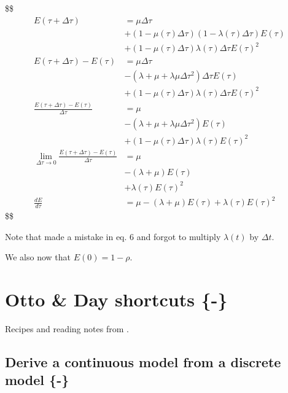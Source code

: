 \documentclass[
]{book}
\theoremstyle{definition}
\theoremstyle{definition}
\theoremstyle{definition}
\theoremstyle{definition}
\theoremstyle{remark}
\begin{document}
\$\$
\begin{align}
  E(\tau + \Delta \tau) &= \mu\Delta \tau \\
  & + (1 - \mu(\tau)\Delta \tau)(1 - \lambda(\tau)\Delta \tau) E(\tau) \\
  & + (1 - \mu(\tau)\Delta \tau) \lambda(\tau)\Delta \tau E(\tau)^2 \\
  
  E(\tau + \Delta \tau) - E(\tau) &= \mu\Delta \tau \\
  & - (\lambda + \mu + \lambda \mu \Delta \tau^2) \Delta \tau E(\tau) \\
  & + (1 - \mu(\tau)\Delta \tau) \lambda(\tau)\Delta \tau E(\tau)^2 \\

  \frac{E(\tau + \Delta \tau) - E(\tau)}{\Delta\tau} &= \mu \\
  & - (\lambda + \mu + \lambda \mu \Delta \tau^2) E(\tau) \\
  & + (1 - \mu(\tau)\Delta \tau) \lambda(\tau) E(\tau)^2
  \\

\lim_{\Delta\tau \to 0} \frac{E(\tau + \Delta \tau) - E(\tau)}{\Delta\tau} &= \mu \\
  & - (\lambda + \mu) E(\tau) \\
  & + \lambda(\tau) E(\tau)^2
  \\

\frac{dE}{d\tau} &= \mu - (\lambda + \mu) E(\tau) + \lambda(\tau) E(\tau)^2

\end{align}
\$\$

Note that \citet{morlon_reconciling_2011} made a mistake in eq. 6 and forgot to multiply \(\lambda(t)\) by \(\Delta t\).

We also now that \(E(0) = 1 - \rho\).

\hypertarget{otto-day}{%
\chapter{Otto \& Day shortcuts \{-\}}\label{otto-day}}

Recipes and reading notes from \citet{otto_biologists_2007}.

\hypertarget{discrete-to-continuous}{%
\section{Derive a continuous model from a discrete model \{-\}}\label{discrete-to-continuous}}
\end{document}
